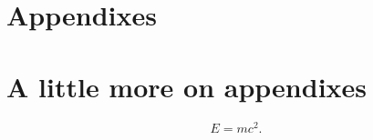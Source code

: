 
\appendix

\section{Appendixes}


\section{A little more on appendixes}

\begin{equation}
E=mc^2.
\end{equation}




